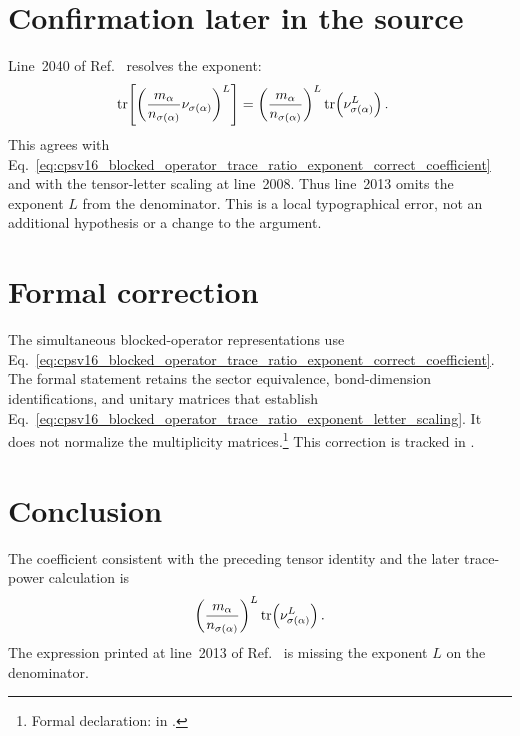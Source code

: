 \documentclass{article}
\begin{document}
\section{Confirmation later in the source}

Line~2040 of Ref.~\cite{Cirac2016MPDO_arXiv} resolves the exponent:
\begin{align}
    \operatorname{tr}\!\left[\left(\frac{m_\alpha}{n_{\sigma(\alpha)}}
            \nu_{\sigma(\alpha)}\right)^L\right]
        &=
    \left(\frac{m_\alpha}{n_{\sigma(\alpha)}}\right)^L
    \operatorname{tr}\!\left(\nu_{\sigma(\alpha)}^L\right).
    \label{eq:cpsv16_blocked_operator_trace_ratio_exponent_source_confirmation}
\end{align}
This agrees with
Eq.~\ref{eq:cpsv16_blocked_operator_trace_ratio_exponent_correct_coefficient}
and with the tensor-letter scaling at line~2008. Thus line~2013 omits the
exponent $L$ from the denominator. This is a local typographical error, not an
additional hypothesis or a change to the argument.

\section{Formal correction}

The simultaneous blocked-operator representations use
Eq.~\ref{eq:cpsv16_blocked_operator_trace_ratio_exponent_correct_coefficient}.
The formal statement retains the sector equivalence, bond-dimension
identifications, and unitary matrices that establish
Eq.~\ref{eq:cpsv16_blocked_operator_trace_ratio_exponent_letter_scaling}. It
does not normalize the multiplicity matrices.\footnote{Formal declaration:
in .}
This correction is tracked in .

\section{Conclusion}

The coefficient consistent with the preceding tensor identity and the later
trace-power calculation is
\begin{align}
    \left(\frac{m_\alpha}{n_{\sigma(\alpha)}}\right)^L
    \operatorname{tr}\!\left(\nu_{\sigma(\alpha)}^L\right).
    \label{eq:cpsv16_blocked_operator_trace_ratio_exponent_verdict_coefficient}
\end{align}
The expression printed at line~2013 of
Ref.~\cite{Cirac2016MPDO_arXiv} is missing the exponent $L$ on the
denominator.



\end{document}
